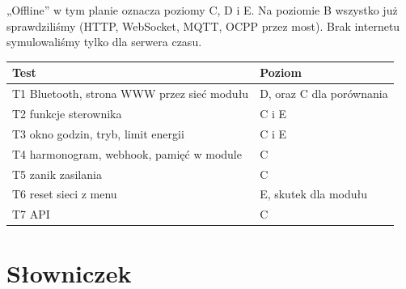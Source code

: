 \documentclass[11pt,a4paper]{article}
\begin{document}
„Offline” w tym planie oznacza poziomy C, D i E. Na poziomie B wszystko już sprawdziliśmy (HTTP, WebSocket, MQTT, OCPP przez most). Brak internetu symulowaliśmy tylko dla serwera czasu.


\begin{longtable}{>{\raggedright\arraybackslash}p{11.76cm}>{\raggedright\arraybackslash}p{3.96cm}}
\toprule
\rowcolor{apteallight}\textbf{Test} & \textbf{Poziom} \\
\midrule\endhead
\bottomrule\endfoot
T1 Bluetooth, strona WWW przez sieć modułu & D, oraz C dla porównania \\
T2 funkcje sterownika & C i E \\
T3 okno godzin, tryb, limit energii & C i E \\
T4 harmonogram, webhook, pamięć w module & C \\
T5 zanik zasilania & C \\
T6 reset sieci z menu & E, skutek dla modułu \\
T7 API & C \\
\end{longtable}

\section*{Słowniczek}
\end{document}
